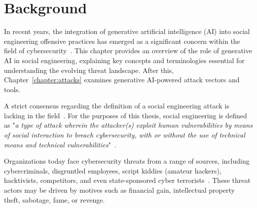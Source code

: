 


\chapter{Background\label{chapter:background}}
\begin{comment}

From study materials:
    - "Konteksti ja käsitteet, haasteet ja arviointikriteerit, arvot, tutkimuskysymysten analyysi"
    - Context and terminology (käsitteet), challenges and measurement criteria, values, research question analysis
    - Tarkentaa tavoiteet ja osakysymykset, vertailukriteerit (jotka jäsentävät muita lukuja)


\end{comment}



%
%
In recent years, the integration of generative artificial intelligence (AI) into social engineering offensive practices has emerged as a significant concern within the field of cybersecurity~\citep{blauth_AI_Crime_Overview_Malicious_Use_Abuse_2022, king_AI_Crime_Interdisciplinary_Analysis_2019, mirsky_Threat_Offensive_AI_Organizations_2023}. This chapter provides an overview of the role of generative AI in social engineering, explaining key concepts and terminologies essential for understanding the evolving threat landscape. After this, Chapter~\ref{chapter:attacks} examines generative AI-powered attack vectors and tools.





%
%
A strict consensus regarding the definition of a social engineering attack is lacking in the field~\citep{hatfield_SE_Evolution_Concept_2018}. For the purposes of this thesis, social engineering is defined as "\textit{a type of attack wherein the attacker(s) exploit human vulnerabilities by means of social interaction to breach cybersecurity, with or without the use of technical means and technical vulnerabilities}"~\citep{wang_Defining_Social_Engineering_2020}.








%
%
Organizations today face cybersecurity threats from a range of sources, including cybercriminals, disgruntled employees, script kiddies (amateur hackers), hacktivists, competitors, and even state-sponsored cyber terrorists~\citep{mirsky_Threat_Offensive_AI_Organizations_2023}. These threat actors may be driven by motives such as financial gain, intellectual property theft, sabotage, fame, or revenge.

